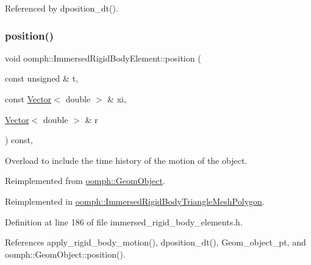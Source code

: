 Referenced by dposition\+\_\+dt().

\mbox{\label{classoomph_1_1ImmersedRigidBodyElement_aca95759d96758c7a4fc81dece7768e9d}} 
\subsubsection{\texorpdfstring{position()}{position()}\hspace{0.1cm}{\footnotesize\ttfamily [2/2]}}
{\footnotesize\ttfamily void oomph\+::\+Immersed\+Rigid\+Body\+Element\+::position (\begin{DoxyParamCaption}\item[{const unsigned \&}]{t,  }\item[{const \hyperlink{classoomph_1_1Vector}{Vector}$<$ double $>$ \&}]{xi,  }\item[{\hyperlink{classoomph_1_1Vector}{Vector}$<$ double $>$ \&}]{r }\end{DoxyParamCaption}) const\hspace{0.3cm}{\ttfamily [inline]}, {\ttfamily [virtual]}}



Overload to include the time history of the motion of the object. 



Reimplemented from \hyperlink{classoomph_1_1GeomObject_ad44a736d23dcd63af163a7d80b5c4dfa}{oomph\+::\+Geom\+Object}.



Reimplemented in \hyperlink{classoomph_1_1ImmersedRigidBodyTriangleMeshPolygon_ad1bd014b31d75703384be201ab65e80f}{oomph\+::\+Immersed\+Rigid\+Body\+Triangle\+Mesh\+Polygon}.



Definition at line 186 of file immersed\+\_\+rigid\+\_\+body\+\_\+elements.\+h.



References apply\+\_\+rigid\+\_\+body\+\_\+motion(), dposition\+\_\+dt(), Geom\+\_\+object\+\_\+pt, and oomph\+::\+Geom\+Object\+::position().

\mbox{\label{classoomph_1_1ImmersedRigidBodyElement_ab1dd410be282f26775715bc14544723f}} 
